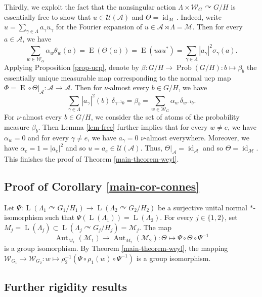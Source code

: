 \documentclass[11pt]{amsart}
\numberwithin{equation}{section}
\theoremstyle{plain}
\theoremstyle{definition}
\newcommand{\Aut}{\operatorname{Aut}}
\newcommand{\id}{\operatorname{id}}
\newcommand{\Prob}{\operatorname{Prob}}
\newcommand{\rE}{\operatorname{ E}}
\newcommand{\rL}{\operatorname{ L}}
\begin{document}
Thirdly, we exploit the fact that the nonsingular action $\Lambda \times \mathscr W_G \curvearrowright G/H$ is essentially free to show that $u \in \mathscr U(\mathscr A)$ and $\Theta = \id_{\mathscr M}$. Indeed, write $u = \sum_{\gamma \in \Lambda} a_\gamma u_\gamma$ for the Fourier expansion of $u \in \mathscr A \rtimes \Lambda = \mathscr M$. Then for every $a \in \mathscr A$, we have
$$\sum_{w \in \mathscr W_G} \alpha_w \theta_w(a) = \rE(\Theta(a)) = \rE(u a u^*) = \sum_{\gamma \in \Lambda} |a_\gamma|^2 \sigma_\gamma(a).$$
Applying Proposition \ref{prop-ucp}, denote by $\beta : G/H \to \Prob(G/H) : b \mapsto \beta_b$ the essentially unique measurable map corresponding to the normal ucp map $\Phi = \rE\circ \Theta|_{\mathscr A} : \mathscr A \to \mathscr A$. Then for $\nu$-almost every $b \in G/H$, we have
$$\sum_{\gamma \in \Lambda} |a_\gamma|^2(b) \, \delta_{\gamma^{-1} b} = \beta_b = \sum_{w \in \mathscr W_G} \alpha_w \, \delta_{w^{-1} b}.$$
For $\nu$-almost every $b \in G/H$, we consider the set of atoms of the probability measure $\beta_b$. Then Lemma \ref{lem-free} further implies that for every $w \neq e$, we have $\alpha_w = 0$ and for every $\gamma \neq e$, we have $a_\gamma = 0$ $\nu$-almost everywhere. Moreover, we have $\alpha_e = 1 = |a_e|^2$ and so $u = a_e \in \mathscr U(\mathscr A)$. Thus, $\Theta|_{\mathscr A} = \id_{\mathscr A}$ and so $\Theta = \id_{\mathscr M}$. This finishes the proof of Theorem \ref{main-theorem-weyl}.

\subsection{Proof of Corollary \ref{main-cor-connes}}

Let $\Psi : \rL(\Lambda_1 \curvearrowright G_1/H_1) \to \rL(\Lambda_2 \curvearrowright G_2/H_2)$ be a surjective unital normal $\ast$-isomorphism such that $\Psi(\rL(\Lambda_1)) = \rL(\Lambda_2)$. For every $j \in \{1, 2\}$, set $M_j = \rL(\Lambda_j) \subset \rL(\Lambda_j \curvearrowright G_j/H_j) = \mathscr M_j$. The map 
$$\Aut_{M_1}(\mathscr M_1) \to \Aut_{M_2}(\mathscr M_2) : \Theta \mapsto \Psi \circ \Theta \circ \Psi^{-1}$$
is a group isomorphism. By Theorem \ref{main-theorem-weyl}, the mapping $\mathscr W_{G_1} \to \mathscr W_{G_2} : w \mapsto \rho_2^{-1}(\Psi \circ \rho_1(w) \circ \Psi^{-1})$ is a group isomorphism.

\subsection{Further rigidity results}
\end{document}
